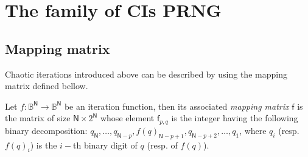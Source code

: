 \chapter{The family of CIs PRNG}
\label{ThefamilyofCIPRNG}
\minitoc
\section{Mapping matrix}

Chaotic iterations introduced above can be described by using the mapping matrix defined bellow.

\begin{definition}
Let $f:\mathds{B}^{\mathsf{N}}\longrightarrow \mathds{B}^{\mathsf{N}}$
be an iteration function, then its associated \emph{mapping matrix}
$\mathsf{f}$ is the matrix of size $\mathsf{N} \times 2^\mathsf{N}$ whose element  $\mathsf{f}_{p,q}$ is the integer having the following binary decomposition:  $q_\mathsf{N}, \hdots, q_{\mathsf{N}-p}, f(q)_{\mathsf{N}-p+1}, q_{\mathsf{N}-p+2}, \hdots, q_1  $, where $q_i$ (resp. $f(q)_i$) is the $i-$th binary digit of $q$ (resp. of $f(q)$).
\end{definition}

